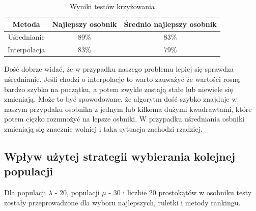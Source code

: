 \begin{table}[H]
    \centering
    \begin{tabular}{|c|c|c|}
    \hline
    Metoda       & Najlepszy osobnik & Średnio najlepszy osobnik \\ \hline
    Uśrednianie  & 89\%              & 83\%                      \\ \hline
    Interpolacja & 83\%              & 79\%                      \\ \hline
    \end{tabular}
    \caption{Wyniki testów krzyżowania}
    \label{tab:crossing}
\end{table}

Dość dobrze widać, że w przypadku naszego problemu lepiej się sprawdza uśrednianie. Jeśli chodzi o interpolacje to warto zauważyć że wartości rosną bardzo szybko na początku, a potem zwykle zostają stałe lub niewiele się zmieniają. Może to być spowodowane, że algorytm dość szybko znajduje w naszym przypdaku osobnika z jednym lub kilkoma dużymi kwadrawtami, które potem ciężko rozmnożyć na lepsze osbniki. W przypadku uśredniania osbniki zmieniają się znacznie wolniej i taka sytuacja zachodzi rzadziej. 

\subsection*{Wpływ użytej strategii wybierania kolejnej populacji}
Dla populacji $\lambda$ - 20, populacji $\mu$ - 30 i liczbie 20 prostokątów w osobniku testy zostały przeprowadzone dla wyboru najlepszych, ruletki i metody rankingu.

